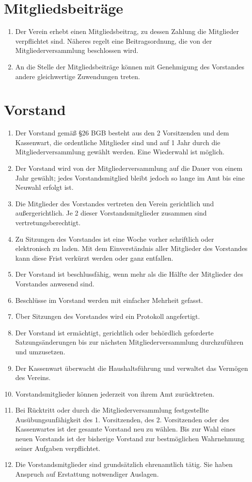 \documentclass[ngerman]{article}
\begin{document}
\section{Mitgliedsbeiträge}
\begin{enumerate}
  \item Der Verein erhebt einen Mitgliedsbeitrag, zu dessen Zahlung die Mitglieder verpflichtet sind. Näheres regelt eine Beitragsordnung, die von der Mitgliederversammlung beschlossen wird.
  \item An die Stelle der Mitgliedsbeiträge können mit Genehmigung des Vorstandes andere gleichwertige Zuwendungen treten.
\end{enumerate}


\section{Vorstand}
\begin{enumerate}
  \item Der Vorstand gemäß §26 BGB besteht aus den 2 Vorsitzenden und dem Kassenwart, die ordentliche Mitglieder sind und auf 1 Jahr durch die Mitgliederversammlung gewählt werden. Eine Wiederwahl ist möglich.
  \item Der Vorstand wird von der Mitgliederversammlung auf die Dauer von einem Jahr gewählt; jedes Vorstandsmitglied bleibt jedoch so lange im Amt bis eine Neuwahl erfolgt ist.
  \item Die Mitglieder des Vorstandes vertreten den Verein gerichtlich und außergerichtlich. Je 2 dieser Vorstandsmitglieder zusammen sind vertretungsberechtigt.
  \item Zu Sitzungen des Vorstandes ist eine Woche vorher schriftlich oder elektronisch zu laden. Mit dem Einverständnis aller Mitglieder des Vorstandes kann diese Frist verkürzt werden oder ganz entfallen.
  \item Der Vorstand ist beschlussfähig, wenn mehr als die Hälfte der Mitglieder des Vorstandes anwesend sind.
  \item Beschlüsse im Vorstand werden mit einfacher Mehrheit gefasst.
  \item Über Sitzungen des Vorstandes wird ein Protokoll angefertigt.
  \item Der Vorstand ist ermächtigt, gerichtlich oder behördlich geforderte Satzungsänderungen bis zur nächsten Mitgliederversammlung durchzuführen und umzusetzen.
  \item Der Kassenwart überwacht die Haushaltsführung und verwaltet das Vermögen des Vereins.
  \item Vorstandsmitglieder können jederzeit von ihrem Amt zurücktreten.
  \item Bei Rücktritt oder durch die Mitgliederversammlung festgestellte Ausübungsunfähigkeit des 1. Vorsitzenden, des 2. Vorsitzenden oder des Kassenwartes ist der gesamte Vorstand neu zu wählen. Bis zur Wahl eines neuen Vorstands ist der bisherige Vorstand zur bestmöglichen Wahrnehmung seiner Aufgaben verpflichtet.
  \item Die Vorstandsmitglieder sind grundsätzlich ehrenamtlich tätig. Sie haben Anspruch auf Erstattung notwendiger Auslagen.
\end{enumerate}
\end{document}
